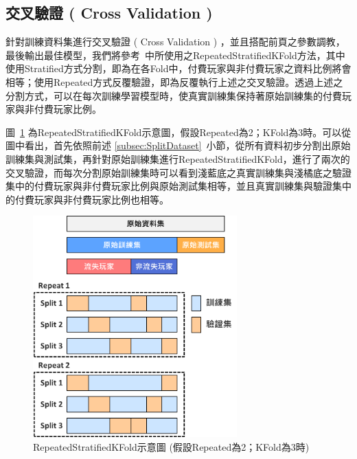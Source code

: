 \subsection{交叉驗證 ( Cross Validation ) }
\label{subsec:CrossValidation}

針對訓練資料集進行交叉驗證 ( Cross Validation ) ，並且搭配前頁之參數調教，最後輸出最佳模型，我們將參考~\cite{brownlee2020imbalanced}中所使用之RepeatedStratifiedKFold方法，其中使用Stratified方式分割，即為在各Fold中，付費玩家與非付費玩家之資料比例將會相等；使用Repeated方式反覆驗證，即為反覆執行上述之交叉驗證。透過上述之分割方式，可以在每次訓練學習模型時，使真實訓練集保持著原始訓練集的付費玩家與非付費玩家比例。

圖~\ref{fig:Image_RepeatedStratifiedKFold} 為RepeatedStratifiedKFold示意圖，假設Repeated為2；KFold為3時。可以從圖中看出，首先依照前述 \ref{subsec:SplitDataset}~小節，從所有資料初步分割出原始訓練集與測試集，再針對原始訓練集進行RepeatedStratifiedKFold，進行了兩次的交叉驗證，而每次分割原始訓練集時可以看到淺藍底之真實訓練集與淺橘底之驗證集中的付費玩家與非付費玩家比例與原始測試集相等，並且真實訓練集與驗證集中的付費玩家與非付費玩家比例也相等。

\begin{figure}[!htb]
  \begin{center}
    \includegraphics[width=0.7\textwidth]{figures/Image_RepeatedStratifiedKFold.png}
    \caption[RepeatedStratifiedKFold示意圖]{RepeatedStratifiedKFold示意圖 (假設Repeated為2；KFold為3時) }
    \label{fig:Image_RepeatedStratifiedKFold}
  \end{center}
\end{figure}

